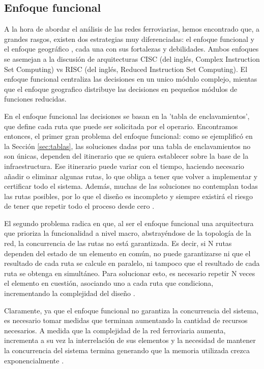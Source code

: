 \subsection{Enfoque funcional}
	\label{sec:funcional}

    A la hora de abordar el análisis de las redes ferroviarias, hemos encontrado que, a grandes rasgos, existen dos estrategias muy diferenciadas: el enfoque funcional y el enfoque geográfico \cite{Paper_9,Paper_204}, cada una con sus fortalezas y debilidades. Ambos enfoques se asemejan a la discusión de arquitecturas CISC (del inglés, Complex Instruction Set Computing) vs RISC (del inglés, Reduced Instruction Set Computing). El enfoque funcional centraliza las decisiones en un unico módulo complejo, mientas que el enfoque geografico distribuye las decisiones en pequeños módulos de funciones reducidas.

    En el enfoque funcional las decisiones se basan en la 'tabla de enclavamientos', que define cada ruta que puede ser solicitada por el operario. Encontramos entonces, el primer gran problema del enfoque funcional: como se ejemplificó en la Sección \ref{sec:tablas}, las soluciones dadas por una tabla de enclavamientos no son únicas, dependen del itinerario que se quiera establecer sobre la base de la infraestructura. Ese itinerario puede variar con el tiempo, haciendo necesario añadir o eliminar algunas rutas, lo que obliga a tener que volver a implementar y certificar todo el sistema. Además, muchas de las soluciones no contemplan todas las rutas posibles, por lo que el diseño es incompleto y siempre existirá el riesgo de tener que repetir todo el proceso desde cero \cite{Paper_204}.

    El segundo problema radica en que, al ser el enfoque funcional una arquitectura que prioriza la funcionalidad a nivel macro, abstrayéndose de la topología de la red, la concurrencia de las rutas no está garantizada. Es decir, si N rutas dependen del estado de un elemento en común, no puede garantizarse ni que el resultado de cada ruta se calcule en paralelo, ni tampoco que el resultado de cada ruta se obtenga en simultáneo. Para solucionar esto, es necesario repetir N veces el elemento en cuestión, asociando uno a cada ruta que condiciona, incrementando la complejidad del diseño \cite{Paper_204}. 
    
    Claramente, ya que el enfoque funcional no garantiza la concurrencia del sistema, es necesario tomar medidas que terminan aumentando la cantidad de recursos necesarios. A medida que la complejidad de la red ferroviaria aumenta, incrementa a su vez la interrelación de sus elementos y la necesidad de mantener la concurrencia del sistema termina generando que la memoria utilizada crezca exponencialmente \cite{Paper_204}.


